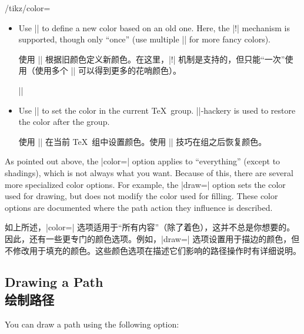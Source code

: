 \begin{key}{/tikz/color=}
\begin{itemize}
            使用 |\definecolor| 来指定新颜色。只支持 |gray|、|rgb| 和 |RGB| 颜色模型\footnote{Con\TeX t 用户应该注意，\texttt{\textbackslash definecolor} 在 Con\TeX t 中有不同的含义。这里有一个名为 \texttt{\textbackslash pgfutil@definecolor} 的底层等效命令可以替代。}。

            \example ||
        \item Use || to define a new color based on an old one.
            Here, the |!| mechanism is supported, though only ``once'' (use
            multiple || for more fancy colors).

            使用 || 根据旧颜色定义新颜色。在这里，|!| 机制是支持的，但只能“一次”使用（使用多个 || 可以得到更多的花哨颜色）。

            \example ||
        \item Use |\color| to set the color in the current
            \TeX\ group. |\aftergroup|-hackery is used to restore the color
            after the group.

            使用 |\color| 在当前 \TeX\ 组中设置颜色。使用 |\aftergroup| 技巧在组之后恢复颜色。
    \end{itemize}
\end{key}

As pointed out above, the |color=| option applies to ``everything'' (except to
shadings), which is not always what you want. Because of this, there are
several more specialized color options. For example, the |draw=| option sets
the color used for drawing, but does not modify the color used for filling.
These color options are documented where the path action they influence is
described.

如上所述，|color=| 选项适用于“所有内容”（除了着色），这并不总是你想要的。因此，还有一些更专门的颜色选项。例如，|draw=| 选项设置用于描边的颜色，但不修改用于填充的颜色。这些颜色选项在描述它们影响的路径操作时有详细说明。


\subsection{Drawing a Path\\绘制路径}

You can draw a path using the following option:

